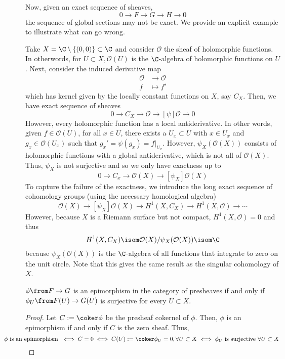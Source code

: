 \documentclass[11pt,leqno,oneside]{amsbook}
\renewcommand{\F}{F} %
\newcommand{\G}{G}
\renewcommand{\H}{H}
\renewcommand{\O}{\mathcal{O}}
\numberwithin{thm}{section}
\begin{document}
Now, given an exact sequence of sheaves, \[
  0 \to \F \to \G \to \H \to 0
\]
the sequence of global sections may not be exact. We provide an
explicit example to illustrate what can go wrong.
\begin{example}
  Take \(X = \C \setminus\{(0,0)\} \subset \C\) and consider \(\O\)
  the sheaf of holomorphic functions. In otherwords, for \(U \subset
  X, \O(U)\) is the \(\C\)-algebra of holomorphic functions on
  \(U\). Next, consider the induced derivative map
  \begin{align*}
    \O & \to \O \\
    f & \mapsto f'
  \end{align*}
  which has kernel given by the locally constant functions on \(X\),
  say \(C_X\). Then, we have exact sequence of sheaves \[
    0 \to C_X \to \O \to[\psi] \O \to 0
  \]
  However, every holomorphic function has a local antiderivative. In
  other words, given \(f \in \O(U)\), for all \(x \in U\), there
  exists a \(U_x \subset U\) with \(x \in U_x\) and \(g_x \in
  \O(U_x)\) such that \(g_x' = \psi(g_x) = f|_{U_x}\). However,
  \(\psi_X(\O(X))\) consists of holomorphic functions with a global
  antiderivative, which is not all of \(\O(X)\). Thus, \(\psi_X\) is
  not surjective and so we only have exactness up to \[
    0 \to C_x \to \O(X) \to[\psi_X] \O(X)
  \]
  To capture the failure of the exactness, we introduce the long exact
  sequence of cohomology
  groups (using the necessary homological algebra) \[
    \O(X) \to[\psi_X] \O(X) \to H^1(X,C_X) \to H^1(X,\O) \to \cdots
  \]
  However, because \(X\) is a
  Riemann surface but not compact, \(H^1(X,\O) = 0\) and thus \[
    H^1(X,C_X) \isom \O(X) / \psi_X(\O(X)) \isom \C
  \]
  because \(\psi_X(\O(X))\) is the \(\C\)-algebra of all functions
  that integrate to zero on the unit circle. Note that this gives the
  same result as the singular cohomology of \(X\).
\end{example}
\begin{prop}
  \(\phi \from \F \to \G\) is an epimorphism in the category of
  presheaves if and only if \(\phi_U \from \F(U) \to \G(U)\) is
  surjective for every \(U \subset X\).
\end{prop}
\begin{proof}
  Let \(C := \coker \phi\) be the presheaf cokernel of \(\phi\). Then,
  \(\phi\) is an epimorphism if and only if \(C\) is the zero
  sheaf. Thus, \[
\hspace{-0.5in}    \phi \text{ is an epimorphism } \iff C = 0 \iff
     C(U) := \coker \phi_U = 0, \forall U 
    \subset X \iff \phi_U \text{ is surjective }\forall U \subset X
  \]
\end{proof}
\end{document}
